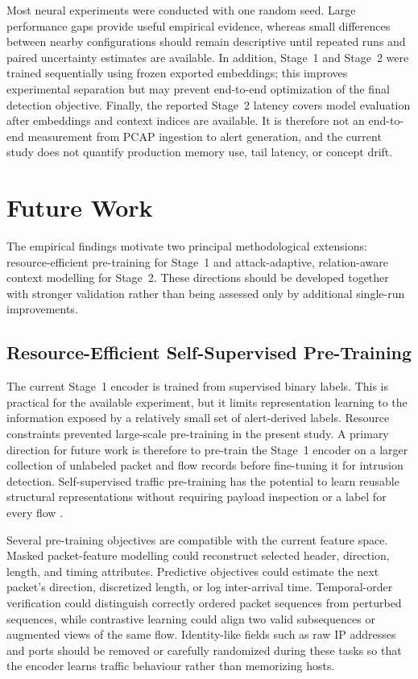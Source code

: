 Most neural experiments were conducted with one random seed. Large performance
gaps provide useful empirical evidence, whereas small differences between
nearby configurations should remain descriptive until repeated runs and paired
uncertainty estimates are available. In addition, Stage~1 and Stage~2 were
trained sequentially using frozen exported embeddings; this improves
experimental separation but may prevent end-to-end optimization of the final
detection objective. Finally, the reported Stage~2 latency covers model
evaluation after embeddings and context indices are available. It is therefore
not an end-to-end measurement from PCAP ingestion to alert generation, and the
current study does not quantify production memory use, tail latency, or concept
drift.

\section{Future Work}
\label{subsec:conclusion_future_work}

The empirical findings motivate two principal methodological extensions:
resource-efficient pre-training for Stage~1 and attack-adaptive,
relation-aware context modelling for Stage~2. These directions should be
developed together with stronger validation rather than being assessed only by
additional single-run improvements.

\subsection{Resource-Efficient Self-Supervised Pre-Training}
\label{subsubsec:future_pretraining}

The current Stage~1 encoder is trained from supervised binary labels. This is
practical for the available experiment, but it limits representation learning
to the information exposed by a relatively small set of alert-derived labels.
Resource constraints prevented large-scale pre-training in the present study.
A primary direction for future work is therefore to pre-train the Stage~1
encoder on a larger collection of unlabeled packet and flow records before
fine-tuning it for intrusion detection. Self-supervised traffic pre-training has
the potential to learn reusable structural representations without requiring
payload inspection or a label for every flow
\cite{2024MAETraffic,Dong2025PretrainingEncrypted}.

Several pre-training objectives are compatible with the current feature space.
Masked packet-feature modelling could reconstruct selected header, direction,
length, and timing attributes. Predictive objectives could estimate the next
packet's direction, discretized length, or log inter-arrival time. Temporal-order
verification could distinguish correctly ordered packet sequences from
perturbed sequences, while contrastive learning could align two valid
subsequences or augmented views of the same flow. Identity-like fields such as
raw IP addresses and ports should be removed or carefully randomized during
these tasks so that the encoder learns traffic behaviour rather than memorizing
hosts.


